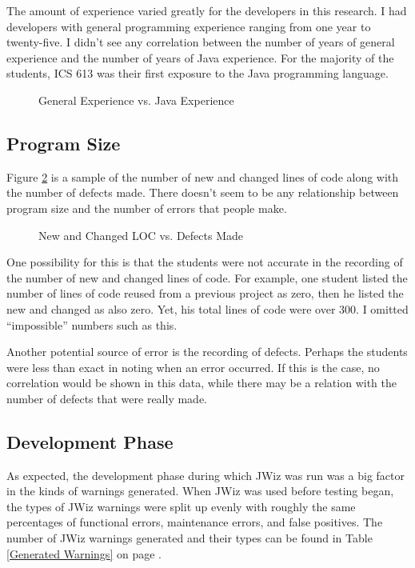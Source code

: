 The amount of experience varied greatly for the developers in this
research.  I had developers with general programming experience ranging
from one year to twenty-five.  I didn't see any correlation between the
number of years of general experience and the number of years of Java
experience.  For the majority of the students, ICS 613 was their first
exposure to the Java programming language.

\begin{figure}[htbp] %
{\centerline{}}
  \caption{General Experience vs. Java Experience}
  \label{Developer Experience}
\end{figure}

\subsection{Program Size}
Figure \ref{LOC vs Defects} is a sample of the number of new and changed
lines of code along with the number of defects made.  There doesn't seem to
be any relationship between program size and the number of errors that
people make.  

\begin{figure}[tbp]%
{\centerline{}}
 \caption{New and Changed LOC vs. Defects Made}
 \label{LOC vs Defects}
\end{figure}

One possibility for this is that the students were not accurate in the
recording of the number of new and changed lines of code.  For example, one
student listed the number of lines of code reused from a previous project
as zero, then he listed the new and changed as also zero.  Yet, his total
lines of code were over 300.  I omitted ``impossible'' numbers such as
this.

Another potential source of error is the recording of defects.  Perhaps the
students were less than exact in noting when an error occurred.  If this is
the case, no correlation would be shown in this data, while there may be a
relation with the number of defects that were really made.

\subsection{Development Phase}
As expected, the development phase during which JWiz was run was a big
factor in the kinds of warnings generated.  When JWiz was used before
testing began, the types of JWiz warnings were split up evenly with roughly
the same percentages of functional errors, maintenance errors, and false
positives.  The number of JWiz warnings generated and their types can be
found in Table \ref{Generated Warnings} on page \pageref{Generated
  Warnings}.

